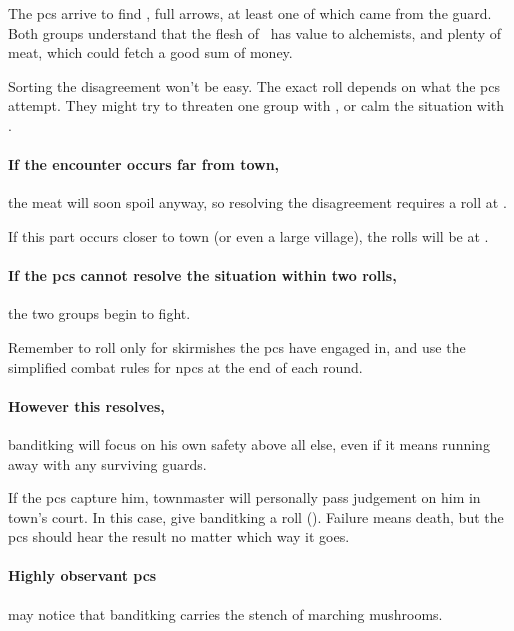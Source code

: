 The \glspl{pc} arrive to find \localMonster, full arrows, at least one of which came from the \gls{guard}.
Both groups understand that the flesh of \localMonster\ has value to alchemists, and plenty of meat, which could fetch a good sum of money.

Sorting the disagreement won't be easy.
The exact roll depends on what the \glspl{pc} attempt.
They might try to threaten one group with , or calm the situation with .

\paragraph{If the encounter occurs far from \gls{town},}
the meat will soon spoil anyway, so resolving the disagreement requires a roll at \tn[9].

If this part occurs closer to \gls{town} (or even a large \gls{village}), the rolls will be at \tn[12].

\paragraph{If the \glspl{pc} cannot resolve the situation within two rolls,}
the two groups begin to fight.

Remember to roll only for skirmishes the \glspl{pc} have engaged in, and use the simplified combat rules for \glspl{npc} at the end of each round.%

\paragraph{However this resolves,}
\gls{banditking} will focus on his own safety above all else, even if it means running away with any surviving guards.

If the \glspl{pc} capture him, \gls{townmaster} will personally pass judgement on him in \gls{town}'s \gls{court}.
In this case, give \gls{banditking} a  roll (\tn[8]).
Failure means death, but the \glspl{pc} should hear the result no matter which way it goes.

\paragraph{Highly observant \glspl{pc}}
may notice that \gls{banditking} carries the stench of marching mushrooms.%

